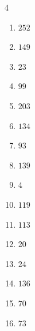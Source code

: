 \begin{multicols}{4}
\begin{enumerate}
  \item $252$


  \item $149$


  \item $23$


  \item $99$


  \item $203$


  \item $134$


\columnbreak %

  \item $93$


  \item $139$


  \item $4$


  \item $119$


  \item $113$


  \item $20$


  \item $24$


  \item $136$


  \item $70$


  \item $73$


\end{enumerate}
\end{multicols}
